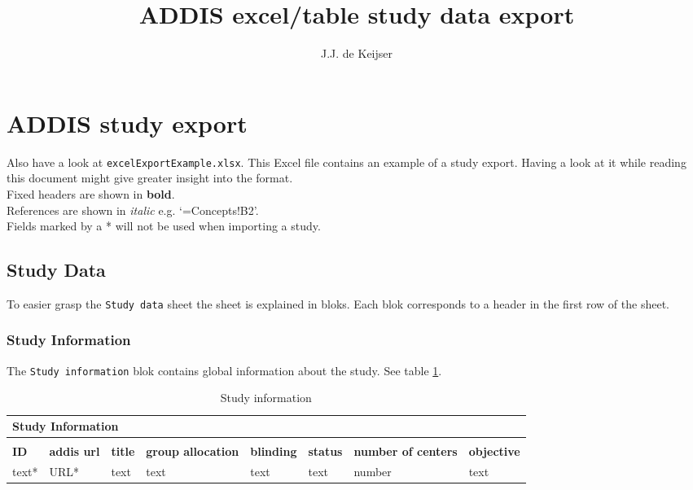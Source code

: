 \documentclass[a4paper,10pt]{article}
\title{ADDIS excel/table study data export}
\author{J.J. de Keijser}
\begin{document}
\maketitle
\section*{ADDIS study export}
Also have a look at \texttt{excelExportExample.xlsx}. This Excel file contains an example of a study export. Having a look at it while reading this document might give greater insight into the format.\\
Fixed headers are shown in \textbf{bold}.\\
References are shown in \textit{italic} e.g. `=Concepts!B2'.\\
Fields marked by a * will not be used when importing a study.

\subsection*{Study Data}
To easier grasp the \texttt{Study data} sheet the sheet is explained in bloks. Each blok corresponds to a header in the first row of the sheet.

\subsubsection*{Study Information}
The \texttt{Study information} blok contains global information about the study. See table \ref{table:Study Information}.
\begin{table}[h]
  \small
  \centering
  \caption{Study information}
  \label{table:Study Information}
  \begin{tabular}{|l|l|l|l|l|l|l|l|}
    \hline
    \multicolumn{8}{|l|}{Study Information} \\ \hline
    \multicolumn{8}{|l|}{}                  \\ \hline
    \textbf{ID} & \textbf{addis url} & \textbf{title} & \textbf{group allocation} & \textbf{blinding} & \textbf{status} & \textbf{number of centers} & \textbf{objective} \\ \hline
    text* & URL* & text & text & text & text & number & text \\ \hline
  \end{tabular}
\end{table}
\end{document}
